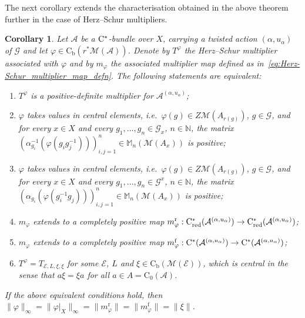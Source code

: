 \documentclass[11 pt, leqno]{amsart}
\numberwithin{equation}{section}
\theoremstyle{plain}
\newtheorem{cor}[thm]{Corollary}
\theoremstyle{definition}
\newcommand{\Mat}{\mathbb M} %
\newcommand*{\contz}{\mathrm{C_0}}%
\newcommand*{\contb}{\mathrm{C_b}}%
\DeclareMathOperator{\red}{red}%
\DeclareMathOperator{\rd}{r}%
\DeclareMathOperator{\f}{f}%
\newcommand{\M}{\mathcal M}
\newcommand{\m}{m}
\newcommand{\G}{\mathcal G} %
\newcommand{\EE}{\mathcal E}
\newcommand{\A}{\mathcal A}
\newcommand{\N}{\mathbb N}
\newcommand{\cst}{\ifmmode\mathrm{C}^*\else{$\mathrm{C}^*$}\fi}
\begin{document}
The next corollary extends the characterisation obtained in the above theorem further in the case of Herz--Schur multipliers. 

\begin{cor}\label{cor:completely_positive_Herz_Schur_multipliers}
Let $\A$ be a $\cst$-bundle over $X$, carrying a twisted action $(\alpha,u_\alpha)$ of $\G$ and let $\varphi \in \contb(r^*\M(\A))$. 
Denote by $T^{\varphi}$ the Herz--Schur multiplier associated with $\varphi$ and by $\m_{\varphi}$ the associated multiplier map defined as in~\eqref{eq:Herz-Schur_multiplier_map_defn}. 
The following statements are equivalent:
\begin{enumerate}
    \item\label{enu:positive_Herz-Shur1} $T^\varphi$ is a positive-definite multiplier for $\A^{(\alpha,u_{\alpha})}$;
    \item\label{enu:positive_Herz-Shur2} $\varphi$ takes values in central elements, i.e.\ $\varphi(g)\in Z\M(A_{r(g)})$, $g\in \G$, and for every $x \in X$ and every $g_1 , \ldots , g_n \in \G_x$, $n \in \N$, the matrix $\left( \alpha_{g_i}^{-1}( \varphi(g_i g_j^{-1}) ) \right)_{i,j = 1}^n \in \Mat_{n}(\M(A_x))$ is positive; 
    \item\label{enu:positive_Herz-Shur3} $\varphi$ takes values in central elements, i.e.\ $\varphi(g)\in Z\M(A_{r(g)})$, $g\in \G$, and for every $x \in X$ and every $g_1 , \ldots , g_n \in \G^x$, $n \in \N$, the matrix $\left( \alpha_{g_i} ( \varphi(g_i^{-1} g_j) ) \right)_{i,j = 1}^n \in \Mat_{n}(\M(A_x))$ is positive;
	\item\label{enu:positive_Herz-Shur4} $\m_\varphi$ extends to a completely positive map $\m_{\varphi}^{\rd} : \cst_{\red}(\A^{(\alpha,u_{\alpha})}) \to \cst_{\red}(\A^{(\alpha,u_{\alpha})})$; 
	\item\label{enu:positive_Herz-Shur5} $\m_\varphi$ extends to a completely positive map $\m_{\varphi}^{\f} : \cst(\A^{(\alpha,u_{\alpha})}) \to \cst(\A^{(\alpha,u_{\alpha})})$;
	\item\label{enu:positive_Herz-Shur6} $T^{\varphi} = T_{\EE,L,\xi,\xi}$ for some $\EE$, $L$ and $\xi\in \contb(\M(\EE))$, which is central in the sense that $a \xi =\xi a$ for all $a\in A=\contz(\A)$.
\end{enumerate}
If the above equivalent conditions hold, then $\|\varphi\|_{\infty} = \| \varphi|_{X} \|_{\infty} = \| \m_{\varphi}^{\rd} \| = \| \m_{\varphi}^{\f} \| = \| \xi \|$.
\end{cor}
\end{document}
